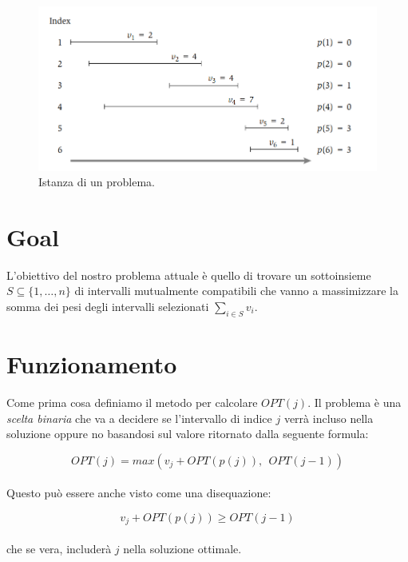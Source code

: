 \begin{figure}[H]
    \centering
    \includegraphics[width=12cm, keepaspectratio]{capitoli/imgs/weighted_problem.png}
    \caption{Istanza di un problema.}
\end{figure}

\section{Goal }

L'obiettivo del nostro problema attuale è quello di trovare un sottoinsieme $S
    \subseteq \{1, \ldots, n\}$ di intervalli mutualmente compatibili che vanno a
massimizzare la somma dei pesi degli intervalli selezionati $\sum_{i \in S}
    v_i$.

\section{Funzionamento}

Come prima cosa definiamo il metodo per calcolare $OPT(j)$. Il problema è
una \textit{scelta binaria} che va a decidere se l'intervallo di indice $j$
verrà incluso nella soluzione oppure no basandosi sul valore ritornato dalla
seguente formula:

\begin{equation}
    \label{eqn:weight-opt}
    OPT(j) = max(v_j + OPT(p(j)), \ \ OPT(j-1))
\end{equation}
\ \\
Questo può essere anche visto come una disequazione:

\begin{equation}
    \label{eqn:weight-opt-dis}
    v_j + OPT(p(j)) \geq OPT(j-1)
\end{equation}
\ \\
che se vera, includerà $j$ nella soluzione ottimale.

\pagebreak

